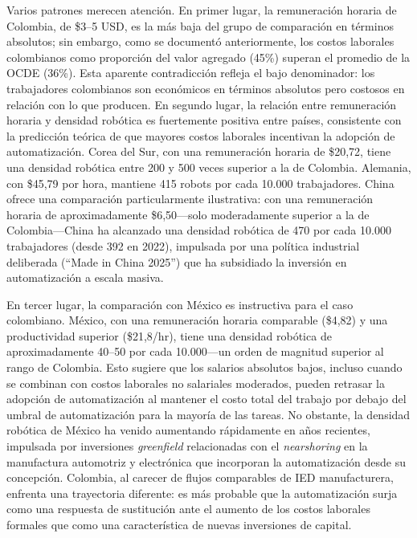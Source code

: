 \documentclass{article}
\begin{document}
Varios patrones merecen atenci\'on. En primer lugar, la remuneraci\'on horaria de Colombia, de \$3--5 USD, es la m\'as baja del grupo de comparaci\'on en t\'erminos absolutos; sin embargo, como se document\'o anteriormente, los costos laborales colombianos como proporci\'on del valor agregado (45\%) superan el promedio de la OCDE (36\%). Esta aparente contradicci\'on refleja el bajo denominador: los trabajadores colombianos son econ\'omicos en t\'erminos absolutos pero costosos en relaci\'on con lo que producen. En segundo lugar, la relaci\'on entre remuneraci\'on horaria y densidad rob\'otica es fuertemente positiva entre pa\'ises, consistente con la predicci\'on te\'orica de que mayores costos laborales incentivan la adopci\'on de automatizaci\'on. Corea del Sur, con una remuneraci\'on horaria de \$20,72, tiene una densidad rob\'otica entre 200 y 500 veces superior a la de Colombia. Alemania, con \$45,79 por hora, mantiene 415 robots por cada 10.000 trabajadores. China ofrece una comparaci\'on particularmente ilustrativa: con una remuneraci\'on horaria de aproximadamente \$6,50---solo moderadamente superior a la de Colombia---China ha alcanzado una densidad rob\'otica de 470 por cada 10.000 trabajadores (desde 392 en 2022), impulsada por una pol\'itica industrial deliberada (``Made in China 2025'') que ha subsidiado la inversi\'on en automatizaci\'on a escala masiva.


En tercer lugar, la comparaci\'on con M\'exico es instructiva para el caso colombiano. M\'exico, con una remuneraci\'on horaria comparable (\$4,82) y una productividad superior (\$21,8/hr), tiene una densidad rob\'otica de aproximadamente 40--50 por cada 10.000---un orden de magnitud superior al rango de Colombia. Esto sugiere que los salarios absolutos bajos, incluso cuando se combinan con costos laborales no salariales moderados, pueden retrasar la adopci\'on de automatizaci\'on al mantener el costo total del trabajo por debajo del umbral de automatizaci\'on para la mayor\'ia de las tareas. No obstante, la densidad rob\'otica de M\'exico ha venido aumentando r\'apidamente en a\~nos recientes, impulsada por inversiones \textit{greenfield} relacionadas con el \textit{nearshoring} en la manufactura automotriz y electr\'onica que incorporan la automatizaci\'on desde su concepci\'on. Colombia, al carecer de flujos comparables de IED manufacturera, enfrenta una trayectoria diferente: es m\'as probable que la automatizaci\'on surja como una respuesta de sustituci\'on ante el aumento de los costos laborales formales que como una caracter\'istica de nuevas inversiones de capital.
\end{document}
